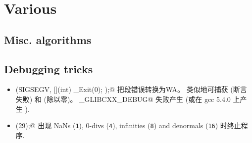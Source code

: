 \chapter{Various}


\section{Misc. algorithms}


\section{Debugging tricks}
	\begin{itemize}
		\item 
		\verb@signal(SIGSEGV, [](int) { _Exit(0); });@ 
		把段错误转换为WA。
		类似地可捕获
		\verb@SIGABRT@(断言失败) 和 \verb@SIGFPE@ (除以零)。
		\verb@_GLIBCXX_DEBUG@
		失败产生 \verb@SIGABRT@ (或在 gcc 5.4.0 上产生 \verb@SIGSEGV@ ).
		\item \verb@feenableexcept(29);@
		出现 NaNs (\texttt 1), 0-divs (\texttt 4), 
		infinities (\texttt 8) and denormals (\texttt{16}) 时终止程序.
	\end{itemize}

